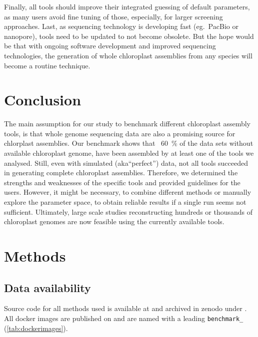 \documentclass{bmcart}
\newcommand{\zenodorepo}{\cite{zenodorepo}}
\begin{document}
Finally, all tools should improve their integrated guessing of default parameters, as many users avoid fine tuning of those, especially, for larger screening approaches.
Last, as sequencing technology is developing fast (eg.\ PacBio or nanopore), tools need to be updated to not become obsolete.
But the hope would be that with ongoing software development and improved sequencing technologies, the generation of whole chloroplast assemblies from any species will become a routine technique.

\section*{Conclusion}
The main assumption for our study to benchmark different chloroplast assembly tools, is that whole genome sequencing data are also a promising source for chlorplast assemblies.
Our benchmark shows that ~\SI{60}{\percent} of the data sets without available chloroplast genome, have been assembled by at least one of the tools we analysed.
Still, even with simulated (aka``perfect'') data, not all tools succeeded in generating complete chloroplast assemblies.
Therefore, we determined the strengths and weaknesses of the specific tools and provided guidelines for the users.
However, it might be necessary, to combine different methods or manually explore the parameter space, to obtain reliable results if a single run seems not sufficient.
Ultimately, large scale studies reconstructing hundreds or thousands of chloroplast genomes are now feasible using the currently available tools. 

\section*{Methods}
\subsection*{Data availability}
Source code for all methods used is available at \cite{github-benchmark-repo} and archived in zenodo under \zenodorepo{}.
All docker images are published on \cite{dockerhub-benchmark} and are named with a leading \texttt{benchmark\_} (\cref{tab:dockerimages}).
\end{document}
